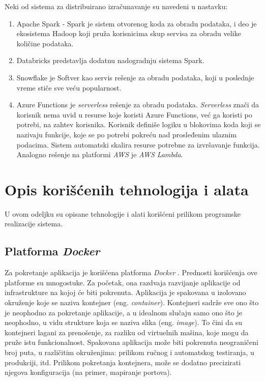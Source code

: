 \documentclass[12pt,oneside]{memoir}
\begin{document}
Neki od sistema za distribuirano izračunavanje su navedeni u nastavku:
\begin{enumerate}
\item\label{spark} Apache Spark \cite{Spark} - Spark je sistem otvorenog koda za obradu podataka, i deo je ekosistema Hadoop koji pruža korisnicima skup servisa za obradu velike količine podataka.
\item Databricks \cite{Databricks} predstavlja dodatnu nadogradnju sistema Spark.
\item Snowflake \cite{Snowflake} je Softver kao servis rešenje za obradu podataka, koji u poslednje vreme stiče sve veću popularnost.
\item\label{azurefunctions} Azure Functions \cite{AzureFunctions} je \emph{serverless} rešenje za obradu podataka. \emph{Serverless} znači da korisnik nema uvid u resurse koje koristi Azure Functions, već ga koristi po potrebi, na zahtev korisnika. Korisnik definiše logiku u blokovima koda koji se nazivaju funkcije, koje se po potrebi pokreću nad prosleđenim ulaznim podacima. Sistem automatski skalira resurse potrebne za izvršavanje funkcija. Analogno rešenje na platformi \emph{AWS} je \emph{AWS Lambda}.
\end{enumerate}


\section{Opis korišćenih tehnologija i alata}

U ovom odeljku su opisane tehnologije i alati korišćeni prilikom programske realizacije sistema.

\subsection{Platforma \emph{Docker}}
\label{subs:docker_platform}

Za pokretanje aplikacija je korišćena platforma \emph{Docker} \cite{Docker}. Prednosti korišćenja ove platforme su mnogostuke. Za početak, ona razdvaja razvijanje aplikacije od infrastrukture na kojoj će biti pokrenuta. Aplikacija je spakovana u izolovano okruženje koje se naziva kontejner (eng. \emph{container}). Kontejneri sadrže sve ono što je neophodno za pokretanje aplikacije, a u idealnom slučaju samo ono što je neophodno, u vidu strukture koja se naziva slika (eng. \emph{image}). To čini da su kontejneri lagani za prenošenje, za razliku od virtuelnih mašina, koje mogu da pruže istu funkcionalnost. Spakovana aplikacija može biti pokrenuta neograničeni broj puta, u različitim okruženjima: prilikom ručnog i automatskog testiranja, u produkciji, itd. Prilikom pokretanja kontejnera, može se dodatno precizirati njegova konfiguracija (na primer, mapiranje portova).
\end{document}
